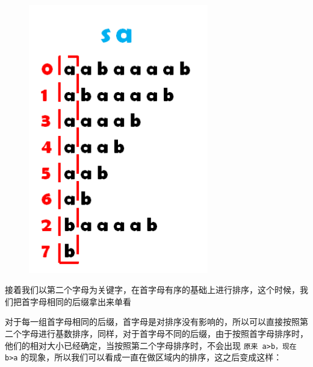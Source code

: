 \begin{figure}[htbp]
\centering
\includegraphics[width=0.7\textwidth]{docs/string/images/sa2.png} 

\end{figure}

接着我们以第二个字母为关键字，在首字母有序的基础上进行排序，这个时候，我们把首字母相同的后缀拿出来单看

对于每一组首字母相同的后缀，首字母是对排序没有影响的，所以可以直接按照第二个字母进行基数排序，同样，对于首字母不同的后缀，由于按照首字母排序时，他们的相对大小已经确定，当按照第二个字母排序时，不会出现 \texttt{原来 a>b，现在 b>a} 的现象，所以我们可以看成一直在做区域内的排序，这之后变成这样：

